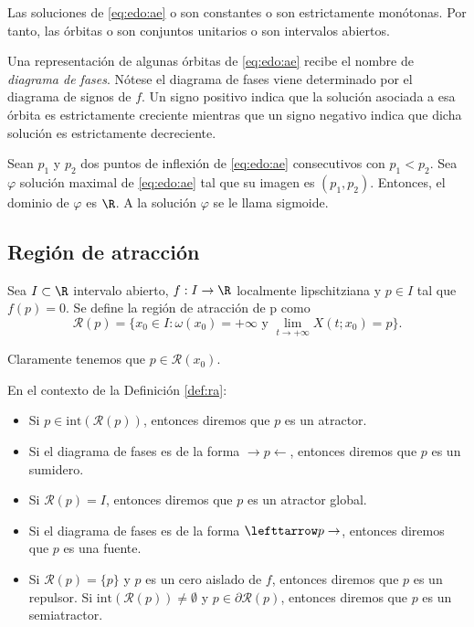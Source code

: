 \documentclass{article}
\begin{document}
\begin{cor}
  Las soluciones de \eqref{eq:edo:ae} o son constantes o son estrictamente monótonas. Por tanto, las
  órbitas o son conjuntos unitarios o son intervalos abiertos.
\end{cor}

Una representación de algunas órbitas de \eqref{eq:edo:ae} recibe el nombre de \emph{diagrama de
  fases}. Nótese el diagrama de fases viene determinado por el diagrama de signos de $f$. Un signo
positivo indica que la solución asociada a esa órbita es estrictamente creciente mientras que un
signo negativo indica que dicha solución es estrictamente decreciente.

\begin{cor}
  Sean $p_1$ y $p_2$ dos puntos de inflexión de \eqref{eq:edo:ae} consecutivos con $p_1 < p_2$. Sea $\varphi$ solución maximal de \eqref{eq:edo:ae} tal que su imagen es $(p_1, p_2)$. Entonces, el dominio de $\varphi$ es $\R$. A la solución $\varphi$ se le llama sigmoide. 
\end{cor}

\begin{definition}
\end{definition}

\subsection{Región de atracción}

\begin{definition}
\label{def:ra}
Sea $I \subset \R$ intervalo abierto, $f: I \to \R$ localmente lipschitziana y $p \in I$ tal que $f(p) = 0$. Se define la región de atracción de p como
\[ \mathcal{R}(p) = \{x_0\in I: \omega(x_0) = +\infty \text{ y } \lim_{t \to +\infty} X(t;x_0) = p\}. \]
\end{definition}

Claramente tenemos que $p \in \mathcal{R}(x_0)$.

\begin{definition}
\label{def:atractor}
En el contexto de la Definición \ref{def:ra}:
\begin{itemize}
\item Si $p \in \mathrm{int}(\mathcal{R}(p))$, entonces diremos que $p$ es un atractor.
\item Si el diagrama de fases es de la forma $\rightarrow p \leftarrow$, entonces diremos que $p$ es un sumidero.
\item Si $\mathcal{R}(p) = I$, entonces diremos que $p$ es un atractor global.
\item Si el diagrama de fases es de la forma $\lefttarrow p \rightarrow$, entonces diremos que $p$ es una fuente.
\item Si $\mathcal{R}(p) = \{p\}$ y $p$ es un cero aislado de $f$, entonces diremos que $p$ es un repulsor.
Si $\mathrm{int}(\mathcal{R}(p)) \ne \emptyset$ y $p \in \partial \mathcal{R}(p)$, entonces diremos que $p$ es un semiatractor.
\end{itemize}
\end{definition}
\end{document}
